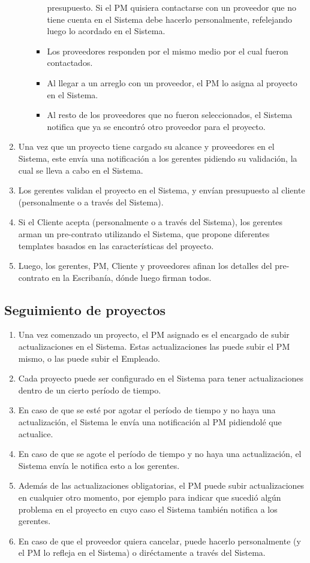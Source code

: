 \begin{enumerate}
\begin{itemize}
\begin{itemize}
                        presupuesto. Si el PM quisiera contactarse con un proveedor que no tiene cuenta en el Sistema debe hacerlo personalmente, refelejando luego lo acordado en el Sistema.
                    \item Los proveedores responden por el mismo medio por el cual fueron contactados.
                    \item Al llegar a un arreglo con un proveedor, el PM lo asigna al proyecto en el Sistema.
                    \item Al resto de los proveedores que no fueron seleccionados, el Sistema notifica que ya se encontró otro proveedor para el proyecto.
                \end{itemize}
        \end{itemize}
    \item Una vez que un proyecto tiene cargado su alcance y proveedores en el Sistema, este envía una notificación a los gerentes pidiendo su validación, la cual se lleva a cabo en el Sistema.
    \item Los gerentes validan el proyecto en el Sistema, y envían presupuesto al cliente (personalmente o a través del Sistema).
    \item Si el Cliente acepta (personalmente o a través del Sistema), los gerentes arman un pre-contrato utilizando el Sistema, que propone diferentes templates basados en las características del proyecto.
    \item Luego, los gerentes, PM, Cliente y proveedores afinan los detalles del pre-contrato en la Escribanía, dónde luego firman todos.
\end{enumerate}

\subsection{Seguimiento de proyectos}
\begin{enumerate}
    \item Una vez comenzado un proyecto, el PM asignado es el encargado de subir actualizaciones en el Sistema. Estas actualizaciones las puede subir el PM mismo, o las puede subir el Empleado.
    \item Cada proyecto puede ser configurado en el Sistema para tener actualizaciones dentro de un cierto período de tiempo.
    \item En caso de que se esté por agotar el período de tiempo y no haya una actualización, el Sistema le envía una notificación al PM pidiendolé que actualice.
    \item En caso de que se agote el período de tiempo y no haya una actualización, el Sistema envía le notifica esto a los gerentes.
    \item Además de las actualizaciones obligatorias, el PM puede subir actualizaciones en cualquier otro momento, por ejemplo para indicar que sucedió algún problema en el proyecto en cuyo caso el Sistema también notifica a los gerentes.
    \item En caso de que el proveedor quiera cancelar, puede hacerlo personalmente (y el PM lo refleja en el Sistema) o diréctamente a través del Sistema.
\end{enumerate}

